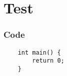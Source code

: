 \part{Test}
\section{Code}
\begin{verbatim}
    int main() {
        return 0;
    }
\end{verbatim}
